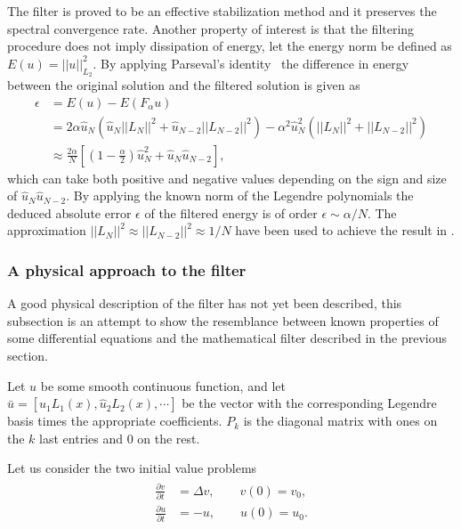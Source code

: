The filter is proved to be an effective stabilization method and it preserves the 
spectral convergence rate. Another property of interest is that the filtering procedure 
does not imply dissipation of energy, let the energy norm be defined as $E(u) = ||u||_{L_2}^2$.  
By applying Parseval's identity~\cite{Young} the difference in energy between the original solution
and the filtered solution is given as 
\begin{align}
   \epsilon&=E(u) - E(F_{\alpha}u) \\
                &= 2\alpha\hat{u}_N(\hat{u}_N||L_N||^2+\hat{u}_{N-2}||L_{N-2}||^2)
    - \alpha^2\hat{u}^2_N(||L_N||^2+||L_{N-2}||^2)\\
    &\approx \frac{2\alpha}{N}\left[  (1-\frac{\alpha}{2})\hat{u}_N^2 + 
    \hat{u}_N\hat{u}_{N-2}\right],
    \label{eq:filterenergy}
\end{align}
which can take both positive and negative values depending on the sign and size of
$\hat{u}_N\hat{u}_{N-2}$. By applying the known norm of the Legendre polynomials 
the deduced absolute error $\epsilon$ of the filtered energy is of order 
$\epsilon\sim \alpha/N$. The approximation $||L_N||^2\approx||L_{N-2}||^2\approx 1/N$
have been used to achieve the result in .

\subsubsection{A physical approach to the filter}\label{physfilt}
A good physical description of the filter has not yet been described, this 
subsection is an attempt to show the resemblance between known properties 
of some differential equations and the mathematical filter described in the previous section.

Let $u$ be some smooth continuous function, and let $\bar u = [\hat u_1L_1(x),\hat u_2L_2(x), \cdots]$
be the vector with the corresponding Legendre basis times the appropriate coefficients. 
$P_{k}$ is the diagonal matrix with ones on the $k$ last entries and $0$ on the rest.

Let us consider the two initial value problems 
\begin{align}
    \begin{split}
    \frac{\partial v }{\partial t} &= \Delta v, \qquad v(0) = v_0, \\
    \frac{\partial u }{\partial t} &= -u, \qquad u(0) = u_0.
    \end{split}
    \label{eq:ivps}
\end{align}

